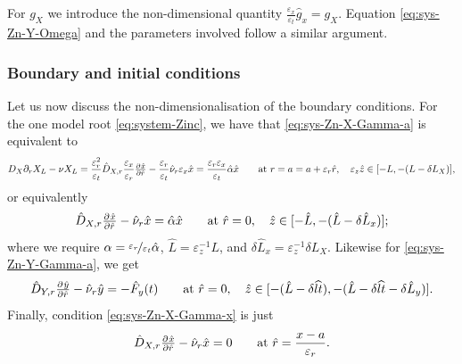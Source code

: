 \documentclass[11pt]{article}
\numberwithin{equation}{section}
\begin{document}
For \(g_X\) we 
introduce the non-dimensional quantity \( \frac{\varepsilon_x}{\varepsilon_t}\hat{g}_{x} = g_X\). Equation \eqref{eq:sys-Zn-Y-Omega} and the parameters involved follow a similar argument.





\subsubsection{Boundary and initial conditions}




Let us now discuss the non-dimensionalisation of the boundary conditions. For the one model root \eqref{eq:system-Zinc}, we have that \eqref{eq:sys-Zn-X-Gamma-a} is equivalent to
\[
    D_X \partial_r X_L - \nu X_L = 
    \frac{\varepsilon_r^2}{\varepsilon_t} \hat{D}_{X,r} \frac{\varepsilon_x}{\varepsilon_r} \pd{\hat{x}}{\hat{r}} - \frac{\varepsilon_r}{\varepsilon_t} \hat{\nu}_r \varepsilon_x \hat{x} = \frac{\varepsilon_r \varepsilon_x}{\varepsilon_t} \hat{\alpha} \hat{x}
    \qquad \text{at } r = a = a + \varepsilon_r \hat{r},\quad \varepsilon_z \hat{z} \in [-L, -(L - \delta L_X)],
\]
or equivalently
\begin{equation}
    \label{eq:sys-Zn-nond-a}
    \hat{D}_{X,r} \pd{\hat{x}}{\hat{r}} - \hat{\nu}_r \hat{x} = \hat{\alpha} \hat{x}
    \qquad \text{at } \hat{r} = 0, \quad \hat{z} \in [-\hat{L}, -(\hat{L} - \delta \hat{L}_x)];
\end{equation}
where we require \( \alpha = \nicefrac{\varepsilon_r}{\varepsilon_t} \hat{\alpha}\), \( \hat{L} = \varepsilon_z^{-1} L\), and \( \delta\hat{L}_x = \varepsilon_z^{-1} \delta L_X\). Likewise for \eqref{eq:sys-Zn-Y-Gamma-a}, we get %
\begin{equation}
    \label{eq:sys-Zn-nond-b}
    \hat{D}_{Y,r} \pd{\hat{y}}{\hat{r}}  - \hat{\nu}_r \hat{y} = -\hat{F}_y(t)     \qquad\text{at } \hat{r} = 0, \quad \hat{z} \in [-(\hat{L} - \delta \widehat{lt}), -(\hat{L} - \delta \widehat{lt} - \delta \hat{L}_y)].
\end{equation}
Finally, condition \eqref{eq:sys-Zn-X-Gamma-x} is just
\begin{equation}
    \label{eq:sys-Zn-nond-x}
    \hat{D}_{X,r} \pd{\hat{x}}{\hat{r}} - \hat{\nu}_r \hat{x} = 0
    \qquad \text{at } \hat{r} = \frac{x-a}{\varepsilon_r}.
\end{equation}
\end{document}
